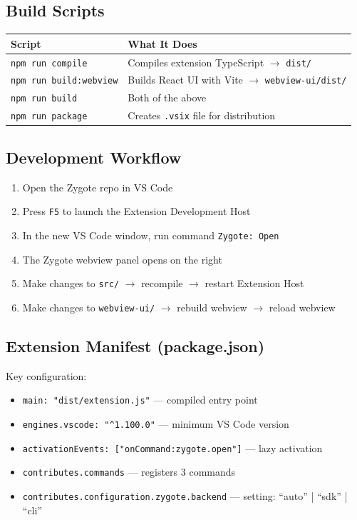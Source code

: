 \documentclass[12pt, a4paper]{article}
\begin{document}
\subsection{Build Scripts}

\begin{table}[H]
\centering
\begin{tabular}{@{}p{4.5cm}p{9cm}@{}}
\toprule
\textbf{Script} & \textbf{What It Does} \\
\midrule
\texttt{npm run compile} & Compiles extension TypeScript $\to$ \texttt{dist/} \\
\texttt{npm run build:webview} & Builds React UI with Vite $\to$ \texttt{webview-ui/dist/} \\
\texttt{npm run build} & Both of the above \\
\texttt{npm run package} & Creates \texttt{.vsix} file for distribution \\
\bottomrule
\end{tabular}
\end{table}

\subsection{Development Workflow}

\begin{enumerate}
    \item Open the Zygote repo in VS Code
    \item Press \texttt{F5} to launch the Extension Development Host
    \item In the new VS Code window, run command \texttt{Zygote: Open}
    \item The Zygote webview panel opens on the right
    \item Make changes to \texttt{src/} $\to$ recompile $\to$ restart Extension Host
    \item Make changes to \texttt{webview-ui/} $\to$ rebuild webview $\to$ reload webview
\end{enumerate}

\subsection{Extension Manifest (package.json)}

Key configuration:
\begin{itemize}
    \item \texttt{main: "dist/extension.js"} --- compiled entry point
    \item \texttt{engines.vscode: "\^{}1.100.0"} --- minimum VS Code version
    \item \texttt{activationEvents: ["onCommand:zygote.open"]} --- lazy activation
    \item \texttt{contributes.commands} --- registers 3 commands
    \item \texttt{contributes.configuration.zygote.backend} --- setting: ``auto'' | ``sdk'' | ``cli''
\end{itemize}
\end{document}

